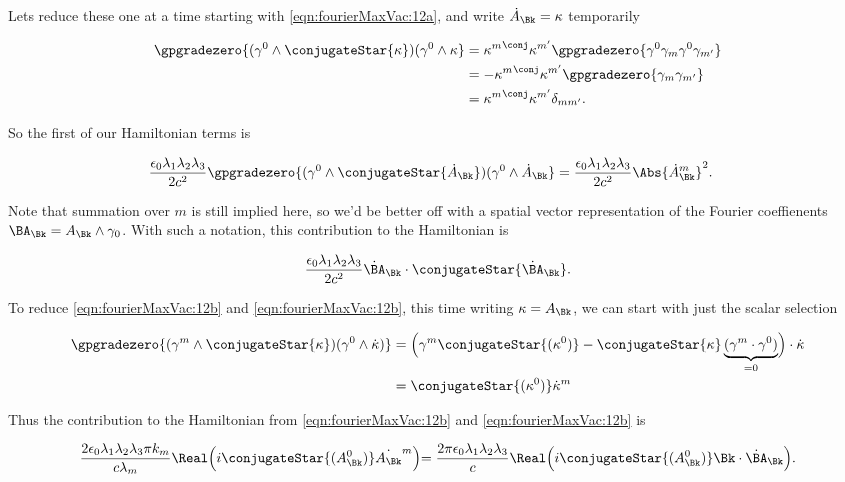 Lets reduce these one at a time starting with \autoref{eqn:fourierMaxVac:12a}, and write $\dot{A}_\Bk = \kappa$ temporarily

\begin{align*}
\gpgradezero{ (\gamma^0 \wedge \conjugateStar{\kappa} ) (\gamma^0 \wedge \kappa } 
&=
{\kappa^m}^{\conj} \kappa^{m'}
\gpgradezero{ \gamma^0 \gamma_m \gamma^0 \gamma_{m'} } \\
&=
-{\kappa^m}^{\conj} \kappa^{m'}
\gpgradezero{ \gamma_m \gamma_{m'} }  \\
&=
{\kappa^m}^{\conj} \kappa^{m'}
\delta_{m m'}.
\end{align*}

So the first of our Hamiltonian terms is

\begin{align}\label{eqn:fourierMaxVac:13}
\frac{\epsilon_0 \lambda_1 \lambda_2 \lambda_3}{2 c^2}
\gpgradezero{ (\gamma^0 \wedge \conjugateStar{\dot{A}_\Bk} ) (\gamma^0 \wedge \dot{A}_\Bk } 
&=
\frac{\epsilon_0 \lambda_1 \lambda_2 \lambda_3}{2 c^2}
\Abs{{{\dot{A}}_{\Bk}}^m}^2.
\end{align}

Note that summation over $m$ is still implied here, so we'd be better off with a spatial vector representation of the Fourier coeffienents $\BA_\Bk = A_\Bk \wedge \gamma_0$.  With such a notation, this contribution to the Hamiltonian is

\begin{align}\label{eqn:fourierMaxVac:13b}
\frac{\epsilon_0 \lambda_1 \lambda_2 \lambda_3}{2 c^2} \dot{\BA}_\Bk \cdot \conjugateStar{\dot{\BA}_\Bk}.
\end{align}

To reduce \autoref{eqn:fourierMaxVac:12b} and \autoref{eqn:fourierMaxVac:12b}, this time writing $\kappa = A_\Bk$, we can start with just the scalar selection

\begin{align*}
\gpgradezero{ (\gamma^m \wedge \conjugateStar{\kappa} ) ( \gamma^0 \wedge \dot{\kappa} ) } 
&=
\Bigl( \gamma^m \conjugateStar{(\kappa^0)} - \conjugateStar{\kappa} \underbrace{(\gamma^m \cdot \gamma^0)}_{=0} \Bigr) \cdot \dot{\kappa} \\
&=
\conjugateStar{(\kappa^0)} \dot{\kappa}^m
\end{align*}

Thus the contribution to the Hamiltonian from \autoref{eqn:fourierMaxVac:12b} and \autoref{eqn:fourierMaxVac:12b} is

\begin{align}\label{eqn:fourierMaxVac:14}
\frac{2 \epsilon_0 \lambda_1 \lambda_2 \lambda_3 \pi k_m}{c \lambda_m} \Real \Bigl( i \conjugateStar{(A_\Bk^0)} \dot{A_\Bk}^m \Bigl)
=
\frac{2 \pi \epsilon_0 \lambda_1 \lambda_2 \lambda_3}{c} \Real \Bigl( i \conjugateStar{(A_\Bk^0)} \Bk \cdot \dot{\BA}_\Bk \Bigl).
\end{align}

